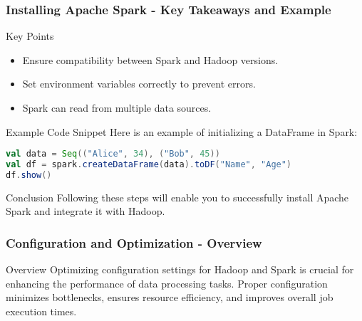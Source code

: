 \documentclass{beamer}
\begin{document}
\begin{frame}[fragile]
    \frametitle{Installing Apache Spark - Key Takeaways and Example}
    \begin{block}{Key Points}
        \begin{itemize}
            \item Ensure compatibility between Spark and Hadoop versions.
            \item Set environment variables correctly to prevent errors.
            \item Spark can read from multiple data sources.
        \end{itemize}
    \end{block}

    \begin{block}{Example Code Snippet}
        Here is an example of initializing a DataFrame in Spark:
        \begin{lstlisting}[language=Scala]
val data = Seq(("Alice", 34), ("Bob", 45))
val df = spark.createDataFrame(data).toDF("Name", "Age")
df.show()
        \end{lstlisting}
    \end{block}
    
    \begin{block}{Conclusion}
        Following these steps will enable you to successfully install Apache Spark and integrate it with Hadoop.
    \end{block}
\end{frame}

\begin{frame}[fragile]
    \frametitle{Configuration and Optimization - Overview}
    \begin{block}{Overview}
        Optimizing configuration settings for Hadoop and Spark is crucial for enhancing the performance of data processing tasks. 
        Proper configuration minimizes bottlenecks, ensures resource efficiency, and improves overall job execution times.
    \end{block}
\end{frame}
\end{document}
